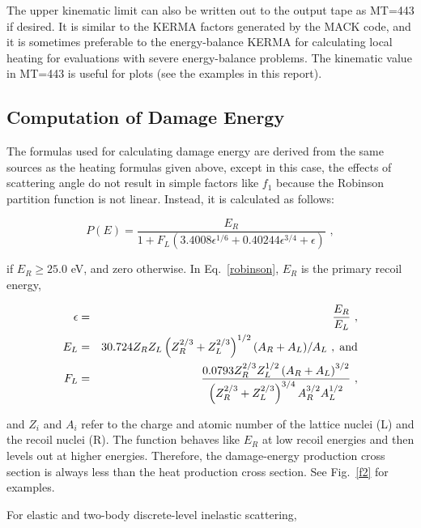 The upper kinematic limit can also be written out to the
output tape as MT=443 if desired.  It is similar to the KERMA
factors generated by the MACK code\cite{MACK}, and it is
sometimes preferable to the energy-balance KERMA for
calculating local heating for evaluations with severe
energy-balance problems.  The kinematic value in MT=443
is useful for plots (see the examples in this report).

\subsection{Computation of Damage Energy}
\label{ssHEATR_damagecomputation}

The formulas used for calculating damage energy are derived
from the same sources as the heating formulas given above,
except in this case, the effects of scattering angle do not
result in simple factors like $f_1$ because the Robinson
partition function is not linear.  Instead, it is
calculated as follows:

\begin{equation}
   P(E)=\frac{E_R}{1+F_L(3.4008\epsilon^{1/6}+0.40244\epsilon^{3/4}
     +\epsilon)}\,\,,
\label{robinson}
\end{equation}
\vspace{0.5 pt}

\noindent
if $E_R\ge 25.0$ eV, and zero otherwise.  In Eq.~\ref{robinson},
$E_R$ is the primary recoil energy,

\begin{eqnarray}
   \epsilon&=&\frac{E_R}{E_L}\,\,,\\
   E_L&=&30.724Z_RZ_L\left(Z_R^{2/3}+Z_L^{2/3}\right)^{1/2}
     (A_R+A_L)/A_L\,\,,\;\hbox{and}\\
   F_L&=&\frac{0.0793Z_R^{2/3}Z_L^{1/2}\left(A_R+A_L\right)^{3/2}}
      {\left(Z_R^{2/3}+Z_L^{2/3}\right)^{3/4}A_R^{3/2}A_L^{1/2}}\,\,,
\end{eqnarray}

\noindent
and $Z_i$ and $A_i$ refer to the charge and atomic number
of the lattice nuclei (L) and the recoil nuclei (R).  The
function behaves like $E_R$ at low recoil energies and then
levels out at higher energies.  Therefore, the damage-energy
production cross section is always less than the heat
production cross section.  See Fig.~\ref{f2} for examples.

For elastic and two-body discrete-level inelastic scattering,

